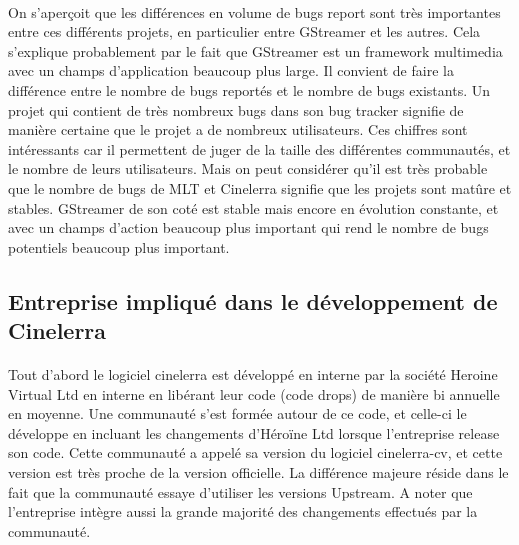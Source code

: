 \paragraph{}

On s'aperçoit que les différences en volume de bugs report sont très
importantes entre ces différents projets, en particulier entre GStreamer
et les autres. Cela s'explique probablement par le fait que GStreamer
est un framework multimedia avec un champs d'application beaucoup
plus large. Il convient de faire la différence entre le nombre de bugs
reportés et le nombre de bugs existants. Un projet qui contient de très
nombreux bugs dans son bug tracker signifie de manière certaine que le
projet a de nombreux utilisateurs. Ces chiffres sont intéressants car
il permettent de juger de la taille des différentes communautés, et le
nombre de leurs utilisateurs. Mais on peut considérer qu'il est très
probable que le nombre de bugs de MLT et Cinelerra signifie
que les projets sont matûre et stables. GStreamer de son coté est
stable mais encore en évolution constante, et avec un champs d'action
beaucoup plus important qui rend le nombre de bugs potentiels beaucoup
plus important.

\subsection {Entreprise impliqué dans le développement de Cinelerra}

\paragraph{}

Tout d'abord le logiciel cinelerra est développé en interne par
la société Heroine Virtual Ltd en interne en libérant leur code
(code drops) de manière bi annuelle en moyenne. Une communauté s'est
formée autour de ce code, et celle-ci le développe en incluant les
changements d'Héroïne Ltd lorsque l'entreprise release son code. Cette
communauté a appelé sa version du logiciel cinelerra-cv, et cette
version est très proche de la version officielle. La différence majeure
réside dans le fait que la communauté essaye d'utiliser les versions
Upstream. A noter que l'entreprise intègre aussi la grande majorité
des changements effectués par la communauté.

\paragraph{}

